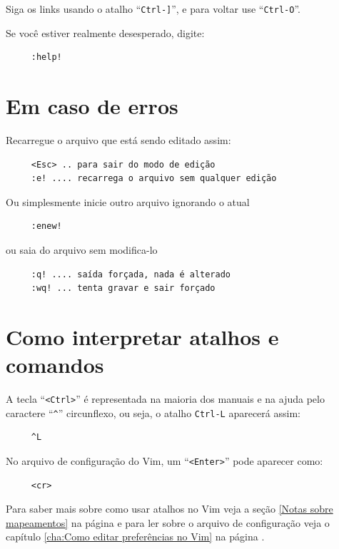 \documentclass[10pt,a4paper,openany]{book}
\begin{document}
Siga os links usando o atalho ``\verb|Ctrl-]|'', e para voltar use
  ``\verb|Ctrl-O|''.

Se você estiver realmente desesperado, digite:

\begin{verbatim}
     :help!
\end{verbatim}



\section{Em caso de erros }\label{Em caso de erros }
Recarregue o arquivo que está sendo editado assim:

\begin{verbatim}
     <Esc> .. para sair do modo de edição
     :e! .... recarrega o arquivo sem qualquer edição
\end{verbatim}

Ou simplesmente inicie outro arquivo ignorando o atual

\begin{verbatim}
     :enew!
\end{verbatim}

ou saia do arquivo sem modifica-lo

\begin{verbatim}
     :q! .... saída forçada, nada é alterado
     :wq! ... tenta gravar e sair forçado
\end{verbatim}

\section{Como interpretar atalhos e comandos}\label{Como interpretar atalhos e comandos}

A tecla ``\verb|<Ctrl>|'' é representada na maioria dos manuais e na ajuda
pelo caractere ``\verb|^|'' circunflexo, ou seja, o atalho \verb|Ctrl-L| aparecerá assim:

\begin{verbatim}
     ^L
\end{verbatim}

No arquivo de configuração do Vim, um ``\verb|<Enter>|'' pode aparecer como:

\begin{verbatim}
     <cr>
\end{verbatim}

Para saber mais sobre como usar atalhos no Vim veja a seção \ref{Notas sobre
mapeamentos} na página \pageref{Notas sobre mapeamentos} e para ler sobre o
arquivo de configuração veja o capítulo \ref{cha:Como editar preferências no Vim} na página
\pageref{cha:Como editar preferências no Vim}.
\end{document}
